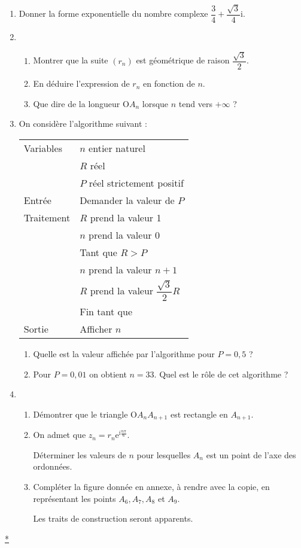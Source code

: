 \documentclass[10pt]{article}
\begin{document}
\begin{enumerate}
\item Donner la forme exponentielle du nombre complexe $\dfrac{3}{4} + \dfrac{\sqrt{3}}{4}\text{i}$. 
\item 
	\begin{enumerate}
		\item Montrer que la suite $\left(r_{n}\right)$ est géométrique de raison 
$\dfrac{\sqrt{3}}{2}$.
		\item En déduire l'expression de $r_{n}$ en fonction de $n$. 
		\item Que dire de la longueur O$A_{n}$ lorsque $n$ tend vers $+ \infty$ ?
	\end{enumerate} 
\item On considère l'algorithme suivant :

\begin{center}
\begin{tabularx}{0.65\linewidth}{|l|X|}\hline 
Variables& $n$ entier naturel\\  
&$R$ réel\\ 
&$P$ réel strictement positif\\ \hline 
Entrée& Demander la valeur de $P$\\ \hline  
Traitement &$R$ prend la valeur 1\\ 
&$n$ prend la valeur 0\\ 
&Tant que $R > P$\\ 
&\hspace{0,5cm}$n$ prend la valeur $n + 1$\\ 
&\hspace{0,5cm}$R$ prend la valeur $\dfrac{\sqrt{3}}{2}R$\\ 
&Fin tant que\\ \hline 
Sortie &Afficher $n$\\ \hline
\end{tabularx}
\end{center} 

	\begin{enumerate}
		\item Quelle est la valeur affichée par l'algorithme pour $P = 0,5$ ? 
		\item Pour $P = 0,01$ on obtient $n = 33$. Quel est le rôle de cet algorithme ?
	\end{enumerate} 
\item 
	\begin{enumerate}
		\item Démontrer que le triangle O$A_{n}A_{n+1}$ est rectangle en $A_{n+1}$. 
		\item On admet que $z_{n} = r_{n}\text{e}^{\text{\'i}\frac{n\pi}{6}}$.
		 
Déterminer les valeurs de $n$ pour lesquelles $A_{n}$ est un point de l'axe des ordonnées. 
		\item Compléter la figure donnée en annexe, à rendre avec la copie, en représentant les points $A_{6}, A_{7}, A_{8}$ et $A_{9}$.
		 
Les traits de construction seront apparents.
	\end{enumerate} 
\end{enumerate}
\hyperlink{Index}{*}
\vspace{0,5cm}
\end{document}
